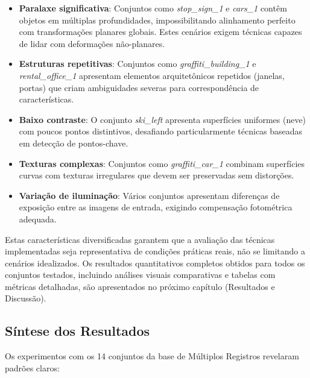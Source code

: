\begin{itemize}
    \item \textbf{Paralaxe significativa}: Conjuntos como \textit{stop\_sign\_1} e \textit{cars\_1} contêm objetos em múltiplas profundidades, impossibilitando alinhamento perfeito com transformações planares globais. Estes cenários exigem técnicas capazes de lidar com deformações não-planares.

    \item \textbf{Estruturas repetitivas}: Conjuntos como \textit{graffiti\_building\_1} e \textit{rental\_office\_1} apresentam elementos arquitetônicos repetidos (janelas, portas) que criam ambiguidades severas para correspondência de características.

    \item \textbf{Baixo contraste}: O conjunto \textit{ski\_left} apresenta superfícies uniformes (neve) com poucos pontos distintivos, desafiando particularmente técnicas baseadas em detecção de pontos-chave.

    \item \textbf{Texturas complexas}: Conjuntos como \textit{graffiti\_car\_1} combinam superfícies curvas com texturas irregulares que devem ser preservadas sem distorções.

    \item \textbf{Variação de iluminação}: Vários conjuntos apresentam diferenças de exposição entre as imagens de entrada, exigindo compensação fotométrica adequada.
\end{itemize}

Estas características diversificadas garantem que a avaliação das técnicas implementadas seja representativa de condições práticas reais, não se limitando a cenários idealizados. Os resultados quantitativos completos obtidos para todos os conjuntos testados, incluindo análises visuais comparativas e tabelas com métricas detalhadas, são apresentados no próximo capítulo (Resultados e Discussão).

\subsection{Síntese dos Resultados}

Os experimentos com os 14 conjuntos da base de Múltiplos Registros revelaram padrões claros:

